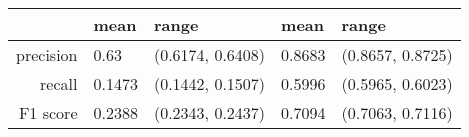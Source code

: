 \begin{table}[ht]
\centering
\begin{tabular}{rllll}
  \hline
 & mean & range & mean & range \\ 
  \hline
precision & 0.63 & (0.6174, 0.6408) & 0.8683 & (0.8657, 0.8725) \\ 
  recall & 0.1473 & (0.1442, 0.1507) & 0.5996 & (0.5965, 0.6023) \\ 
  F1 score & 0.2388 & (0.2343, 0.2437) & 0.7094 & (0.7063, 0.7116) \\ 
   \hline
\end{tabular}
\end{table}
